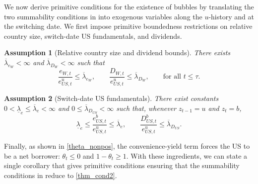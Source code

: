 \documentclass[12pt]{article}
\theoremstyle{plain}
\newtheorem{ass}{Assumption}
\begin{document}
We now derive primitive conditions for the existence of bubbles by translating the two summability conditions
in  into exogenous variables along the $u$-history and at the switching date. We first impose primitive
boundedness restrictions on relative country size, switch-date US fundamentals, and dividends.

\begin{ass}[Relative country size and dividend bounds]\label{ass_relative_dividend_bounds}
There exists $\overline\lambda_{e_W}<\infty$ and $\overline\lambda_{D_W}<\infty$ such that
\[
\frac{e_{W,t}}{e_{US,t}^u}\le \overline\lambda_{e_W},
\qquad 
\frac{D_{W,t}}{e_{US,t}^u} \le \overline\lambda_{D_W},
\qquad\text{for all }t\le \tau.
\]
\end{ass}

\begin{ass}[Switch-date US fundamentals]\label{ass_switch_us_fundamentals}
There exist constants $0<\underline\lambda_e\le \overline\lambda_e<\infty$ and
$0\le \overline\lambda_{D_{US}}<\infty$ such that, whenever $z_{t-1}=u$ and $z_t=b$,
\[
\underline\lambda_e
\le
\frac{e_{US,t}^b}{e_{US,t}^u}
\le
\overline\lambda_e,
\qquad
\frac{D_{US,t}^b}{e_{US,t}^u}
\le
\overline\lambda_{D_{US}}.
\]
\end{ass}


Finally, as shown in \eqref{theta_nonpos}, the convenience-yield term forces the US to be a net borrower:
$\theta_t\le 0$ and $1-\theta_t\ge 1$. With these ingredients, we can state a single corollary that 
gives primitive conditions ensuring that the
summability conditions in  reduce to \eqref{thm_cond2}.
\end{document}
